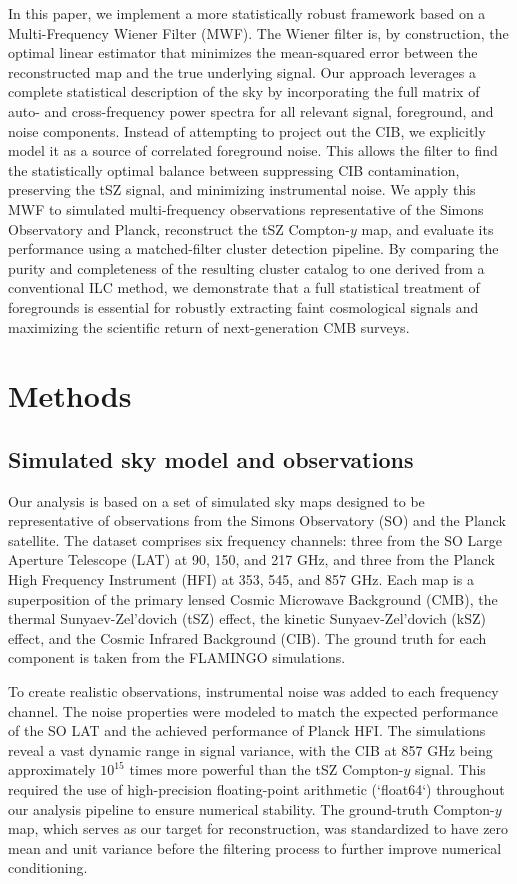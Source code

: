 \documentclass[]{article}
\begin{document}
In this paper, we implement a more statistically robust framework based on a Multi-Frequency Wiener Filter (MWF). The Wiener filter is, by construction, the optimal linear estimator that minimizes the mean-squared error between the reconstructed map and the true underlying signal. Our approach leverages a complete statistical description of the sky by incorporating the full matrix of auto- and cross-frequency power spectra for all relevant signal, foreground, and noise components. Instead of attempting to project out the CIB, we explicitly model it as a source of correlated foreground noise. This allows the filter to find the statistically optimal balance between suppressing CIB contamination, preserving the tSZ signal, and minimizing instrumental noise. We apply this MWF to simulated multi-frequency observations representative of the Simons Observatory and Planck, reconstruct the tSZ Compton-$y$ map, and evaluate its performance using a matched-filter cluster detection pipeline. By comparing the purity and completeness of the resulting cluster catalog to one derived from a conventional ILC method, we demonstrate that a full statistical treatment of foregrounds is essential for robustly extracting faint cosmological signals and maximizing the scientific return of next-generation CMB surveys.

\section{Methods}
\label{sec:methods}
\subsection{Simulated sky model and observations}
Our analysis is based on a set of simulated sky maps designed to be representative of observations from the Simons Observatory (SO) and the Planck satellite. The dataset comprises six frequency channels: three from the SO Large Aperture Telescope (LAT) at 90, 150, and 217 GHz, and three from the Planck High Frequency Instrument (HFI) at 353, 545, and 857 GHz. Each map is a superposition of the primary lensed Cosmic Microwave Background (CMB), the thermal Sunyaev-Zel'dovich (tSZ) effect, the kinetic Sunyaev-Zel'dovich (kSZ) effect, and the Cosmic Infrared Background (CIB). The ground truth for each component is taken from the FLAMINGO simulations.

To create realistic observations, instrumental noise was added to each frequency channel. The noise properties were modeled to match the expected performance of the SO LAT and the achieved performance of Planck HFI. The simulations reveal a vast dynamic range in signal variance, with the CIB at 857 GHz being approximately $10^{15}$ times more powerful than the tSZ Compton-$y$ signal. This required the use of high-precision floating-point arithmetic (`float64`) throughout our analysis pipeline to ensure numerical stability. The ground-truth Compton-$y$ map, which serves as our target for reconstruction, was standardized to have zero mean and unit variance before the filtering process to further improve numerical conditioning.
\end{document}
